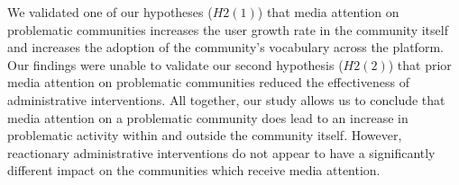 
 We validated one of our hypotheses
($H2(1)$) that media attention on problematic communities increases the
user growth rate in the community itself and increases the adoption of the
community's vocabulary across the platform. Our findings were unable to
validate our second hypothesis ($H2(2)$) that prior media attention on
problematic communities reduced the effectiveness of administrative
interventions. All together, our study allows us to conclude that media
attention on a problematic community does lead to an increase in problematic
activity within and outside the community itself. However, reactionary
administrative interventions do not appear to have a significantly different
impact on the communities which receive media attention.


